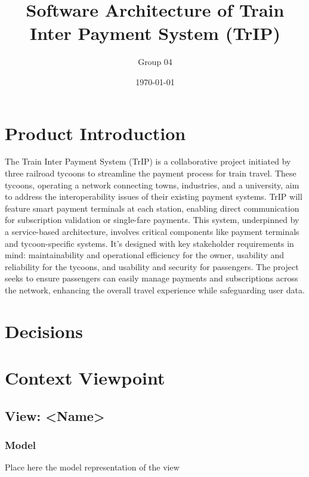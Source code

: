 \documentclass{article}
\title{Software Architecture of Train Inter Payment System (TrIP)}
\author{Group 04}
\date{\today}
\begin{document}
\maketitle
\newpage

\tableofcontents %
\newpage


\section{Product Introduction}
The Train Inter Payment System (TrIP) is a collaborative project initiated by three railroad tycoons to streamline the payment process for train travel. These tycoons, operating a network connecting towns, industries, and a university, aim to address the interoperability issues of their existing payment systems. TrIP will feature smart payment terminals at each station, enabling direct communication for subscription validation or single-fare payments. This system, underpinned by a service-based architecture, involves critical components like payment terminals and tycoon-specific systems. It's designed with key stakeholder requirements in mind: maintainability and operational efficiency for the owner, usability and reliability for the tycoons, and usability and security for passengers. The project seeks to ensure passengers can easily manage payments and subscriptions across the network, enhancing the overall travel experience while safeguarding user data.
\newpage

\section{Decisions}

\newpage

\newpage

\newpage

\newpage

\newpage

\newpage

\newpage

\newpage

% 

\section{Context Viewpoint}
\subsection*{View: \textless{}Name\textgreater{}}
\subsubsection*{Model}
Place here the model representation of the view
\end{document}
